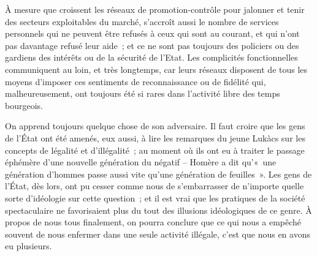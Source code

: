 \documentclass[french,twoside]{book} %
\def\bignobreak{\ifdim\lastskip<\bigskipamount
  \removelastskip\nopagebreak\bigskip\fi}
\newcommand{\labelblock}[1]{\bigbreak{\color{rubric}\noindent\textbf{#1}\par}\bignobreak}
\begin{document}
À mesure que croissent les réseaux de promotion-contrôle pour jalonner et tenir des secteurs exploitables du marché, s’accroît aussi le nombre de services personnels qui ne peuvent être refusés à ceux qui sont au courant, et qui n’ont pas davantage refusé leur aide ; et ce ne sont pas toujours des policiers ou des gardiens des intérêts ou de la sécurité de l’Etat. Les complicités fonctionnelles communiquent au loin, et très longtemps, car leurs réseaux disposent de tous les moyens d’imposer ces sentiments de reconnaissance ou de fidélité qui, malheureusement, ont toujours été si rares dans l’activité libre des temps bourgeois.\par
On apprend toujours quelque chose de son adversaire. Il faut croire que les gens de l’État ont été amenés, eux aussi, à lire les remarques du jeune Lukàcs sur les concepts de légalité et d’illégalité ; au moment où ils ont eu à traiter le passage éphémère d’une nouvelle génération du négatif – Homère a dit qu’« une génération d’hommes passe aussi vite qu’une génération de feuilles ». Les gens de l’État, dès lors, ont pu cesser comme nous de s’embarrasser de n’importe quelle sorte d’idéologie sur cette question ; et il est vrai que les pratiques de la société spectaculaire ne favorisaient plus du tout des illusions idéologiques de ce genre. À propos de nous tous finalement, on pourra conclure que ce qui nous a empêché souvent de nous enfermer dans une seule activité illégale, c’est que nous en avons eu plusieurs.\par

\labelblock{XXVII}
\end{document}
